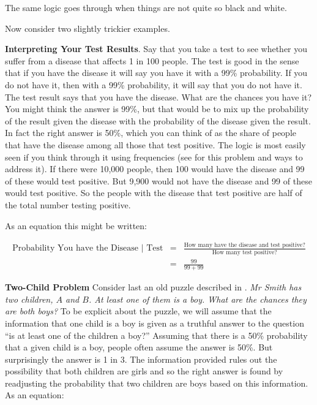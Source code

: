\documentclass[
  12pt,
]{book}
\begin{document}
The same logic goes through when things are not quite so black and white.

Now consider two slightly trickier examples.

\textbf{Interpreting Your Test Results}. Say that you take a test to see whether you suffer from a disease that affects 1 in 100 people. The test is good in the sense that if you have the disease it will say you have it with a 99\% probability. If you do not have it, then with a 99\% probability, it will say that you do not have it. The test result says that you have the disease. What are the chances you have it? You might think the answer is 99\%, but that would be to mix up the probability of the result given the disease with the probability of the disease given the result. In fact the right answer is 50\%, which you can think of as the share of people that have the disease among all those that test positive. The logic is most easily seen if you think through it using frequencies (see \citet{hoffrage1998using} for this problem and ways to address it). If there were 10,000 people, then 100 would have the disease and 99 of these would test positive. But 9,900 would not have the disease and 99 of these would test positive. So the people with the disease that test positive are half of the total number testing positive.

As an equation this might be written:

\begin{eqnarray}
\text{Probability You have the Disease | Test} &=& \frac{\text{How many have the disease and test positive?}}{\text{How many test positive?}}\\ 
&=& \frac{99}{99 + 99}
\end{eqnarray}

\textbf{Two-Child Problem} Consider last an old puzzle described in \citet{gardner1961second}. \emph{Mr Smith has two children, \(A\) and \(B\). At least one of them is a boy. What are the chances they are both boys?}
To be explicit about the puzzle, we will assume that the information that one child is a boy is given as a truthful answer to the question ``is at least one of the children a boy?'' Assuming that there is a 50\% probability that a given child is a boy, people often assume the answer is 50\%. But surprisingly the answer is 1 in 3. The information provided rules out the possibility that both children are girls and so the right answer is found by readjusting the probability that two children are boys based on this information. As an equation:
\end{document}

